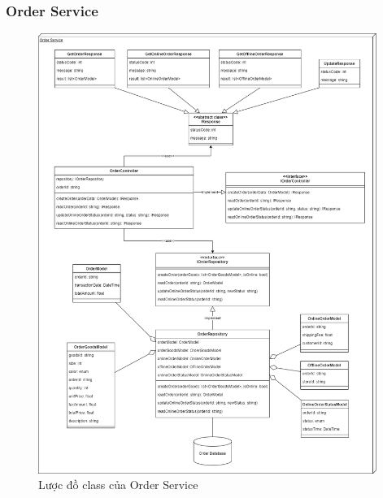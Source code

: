 \subsubsection{Order Service}
\begin{figure}[!htp]
	\centering
	\includegraphics[width=11cm]{img/Architecture/service/OrderService.png}
	\newline
	\caption{Lược đồ class của Order Service}
\end{figure}



